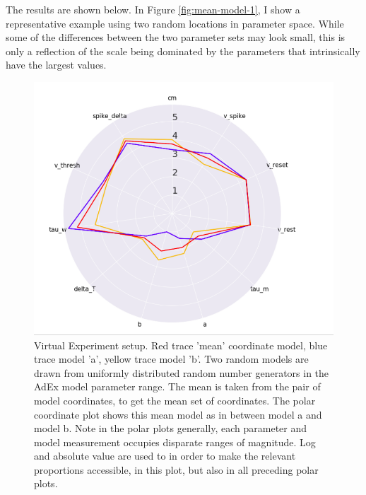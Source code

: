 The results are shown below.
In Figure \ref{fig:mean-model-1}, I show a representative example using two random locations in parameter space.
While some of the differences between the two parameter sets may look small, this is only a reflection of the scale being dominated by the parameters that intrinsically have the largest values.

\begin{figure}
\begin{center}
\includegraphics[]{figures/polar_coordinates.png}


\caption[Random model pair, and mean model]{Virtual Experiment setup. Red trace 'mean' coordinate model, blue trace model 'a', yellow trace model 'b'. Two random models are drawn from uniformly distributed random number generators in the AdEx model parameter range. The mean is taken from the pair of model coordinates, to get the mean set of coordinates. The polar coordinate plot shows this mean model as in between model a and model b. Note in the polar plots generally, each parameter and model measurement occupies disparate ranges of magnitude. Log and absolute value are used to in order to make the relevant proportions accessible, in this plot, but also in all preceding polar plots.}
\end{center}
\end{figure}



